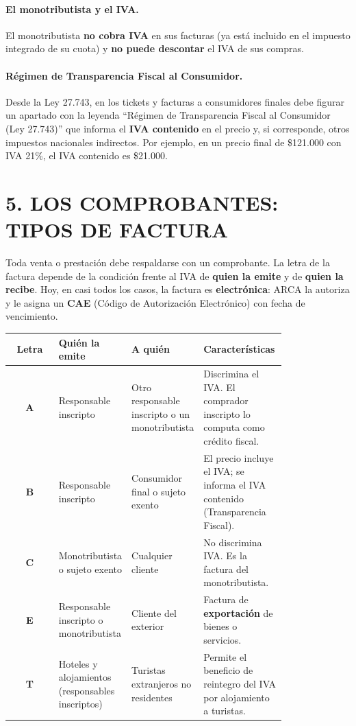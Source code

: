 \paragraph*{El monotributista y el IVA.}
El monotributista \textbf{no cobra IVA} en sus facturas (ya está incluido en el impuesto
integrado de su cuota) y \textbf{no puede descontar} el IVA de sus compras.

\paragraph*{Régimen de Transparencia Fiscal al Consumidor.}
Desde la Ley 27.743, en los tickets y facturas a consumidores finales debe figurar un
apartado con la leyenda ``Régimen de Transparencia Fiscal al Consumidor (Ley 27.743)'' que
informa el \textbf{IVA contenido} en el precio y, si corresponde, otros impuestos
nacionales indirectos. Por ejemplo, en un precio final de \$121.000 con IVA 21\%, el IVA
contenido es \$21.000.

\section*{5. LOS COMPROBANTES: TIPOS DE FACTURA}

Toda venta o prestación debe respaldarse con un comprobante. La letra de la factura
depende de la condición frente al IVA de \textbf{quien la emite} y de \textbf{quien la
recibe}. Hoy, en casi todos los casos, la factura es \textbf{electrónica}: ARCA la autoriza
y le asigna un \textbf{CAE} (Código de Autorización Electrónico) con fecha de vencimiento.

\begin{center}
\small
\begin{tabular}{|c|p{0.25\linewidth}|p{0.25\linewidth}|p{0.30\linewidth}|}
\hline
\textbf{Letra} & \textbf{Quién la emite} & \textbf{A quién} & \textbf{Características} \\ \hline
\textbf{A} & Responsable inscripto & Otro responsable inscripto o un monotributista &
Discrimina el IVA. El comprador inscripto lo computa como crédito fiscal. \\ \hline
\textbf{B} & Responsable inscripto & Consumidor final o sujeto exento &
El precio incluye el IVA; se informa el IVA contenido (Transparencia Fiscal). \\ \hline
\textbf{C} & Monotributista o sujeto exento & Cualquier cliente &
No discrimina IVA. Es la factura del monotributista. \\ \hline
\textbf{E} & Responsable inscripto o monotributista & Cliente del exterior &
Factura de \textbf{exportación} de bienes o servicios. \\ \hline
\textbf{T} & Hoteles y alojamientos (responsables inscriptos) & Turistas extranjeros
no residentes & Permite el beneficio de reintegro del IVA por alojamiento a turistas. \\ \hline
\end{tabular}
\end{center}

